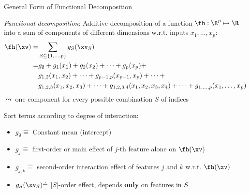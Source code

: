 \documentclass[11pt,compress,t,notes=noshow, aspectratio=169, xcolor=table]{beamer}
\newcommand{\open}{}
\newcommand{\close}{}
\begin{document}
\begin{frame}{General Form of Functional Decomposition
}


\begin{definition}
\textit{Functional decomposition}: Additive decomposition of a function $\fh: \R^p \mapsto \R$ into a sum of components of different dimensions w.r.t. inputs $x_1, \ldots, x_p$: \\
\begin{equation}
\begin{split}
\fh(\xv) = &  %
\sum_{S \subseteq \{1,\ldots,p\}} g_{S}(\xv_S) \\
= & g_{\open \emptyset \close} +
g_{\open 1 \close}(x_1) + g_{\open 2 \close}(x_2) + \dots + g_{\open p \close}(x_p) + \\
& g_{\open 1, 2 \close}(x_1, x_2) + \dots + g_{\open p-1, p \close}(x_{p-1}, x_p) + \dots + \\
& g_{\open 1, 2, 3 \close}(x_1, x_2, x_3) + \dots +
g_{\open 1, 2, 3, 4 \close}(x_1, x_2, x_3, x_4) + \dots +
g_{\open 1,\ldots,p \close}(x_1, \ldots, x_p)
\end{split}    
\end{equation}
$\leadsto$ one component for every possible combination $S$ of indices
\end{definition}
Sort terms according to degree of interaction:
\begin{itemize}
\item $g_{\open \emptyset \close} \hat = $ Constant mean (intercept) %
\item $g_{\open j \close} \hat = $ first-order or main effect of $j$-th feature alone on $\fh(\xv)$
\item $g_{\open j, k \close} \hat = $ second-order interaction effect of features $j$ and $k$ w.r.t. $\fh(\xv)$%
\item $g_{S}(\xv_S) \hat = $ $|S|$-order effect, depends \textbf{only} on features in $S$ %
\end{itemize}
\lz
\end{frame}
\end{document}
